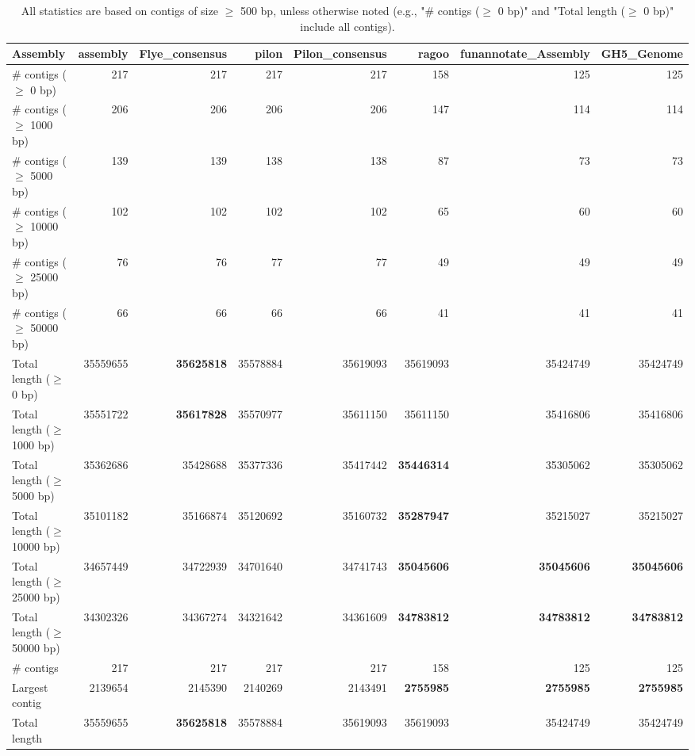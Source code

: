 \documentclass[12pt,a4paper]{article}
\begin{document}
\begin{table}[ht]
\begin{center}
\caption{All statistics are based on contigs of size $\geq$ 500 bp, unless otherwise noted (e.g., "\# contigs ($\geq$ 0 bp)" and "Total length ($\geq$ 0 bp)" include all contigs).}
\begin{tabular}{|l*{7}{|r}|}
\hline
Assembly & assembly & Flye\_consensus & pilon & Pilon\_consensus & ragoo & funannotate\_Assembly & GH5\_Genome \\ \hline
\# contigs ($\geq$ 0 bp) & 217 & 217 & 217 & 217 & 158 & 125 & 125 \\ \hline
\# contigs ($\geq$ 1000 bp) & 206 & 206 & 206 & 206 & 147 & 114 & 114 \\ \hline
\# contigs ($\geq$ 5000 bp) & 139 & 139 & 138 & 138 & 87 & 73 & 73 \\ \hline
\# contigs ($\geq$ 10000 bp) & 102 & 102 & 102 & 102 & 65 & 60 & 60 \\ \hline
\# contigs ($\geq$ 25000 bp) & 76 & 76 & 77 & 77 & 49 & 49 & 49 \\ \hline
\# contigs ($\geq$ 50000 bp) & 66 & 66 & 66 & 66 & 41 & 41 & 41 \\ \hline
Total length ($\geq$ 0 bp) & 35559655 & {\bf 35625818} & 35578884 & 35619093 & 35619093 & 35424749 & 35424749 \\ \hline
Total length ($\geq$ 1000 bp) & 35551722 & {\bf 35617828} & 35570977 & 35611150 & 35611150 & 35416806 & 35416806 \\ \hline
Total length ($\geq$ 5000 bp) & 35362686 & 35428688 & 35377336 & 35417442 & {\bf 35446314} & 35305062 & 35305062 \\ \hline
Total length ($\geq$ 10000 bp) & 35101182 & 35166874 & 35120692 & 35160732 & {\bf 35287947} & 35215027 & 35215027 \\ \hline
Total length ($\geq$ 25000 bp) & 34657449 & 34722939 & 34701640 & 34741743 & {\bf 35045606} & {\bf 35045606} & {\bf 35045606} \\ \hline
Total length ($\geq$ 50000 bp) & 34302326 & 34367274 & 34321642 & 34361609 & {\bf 34783812} & {\bf 34783812} & {\bf 34783812} \\ \hline
\# contigs & 217 & 217 & 217 & 217 & 158 & 125 & 125 \\ \hline
Largest contig & 2139654 & 2145390 & 2140269 & 2143491 & {\bf 2755985} & {\bf 2755985} & {\bf 2755985} \\ \hline
Total length & 35559655 & {\bf 35625818} & 35578884 & 35619093 & 35619093 & 35424749 & 35424749 \\ \hline

\end{tabular}
\end{center}
\end{table}
\end{document}
